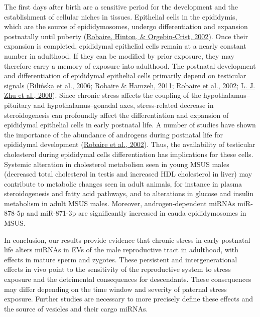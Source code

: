 \documentclass[12pt,twoside]{reedthesis}
\begin{document}
The first days after birth are a sensitive period for the development
and the establishment of cellular niches in tissues. Epithelial cells in
the epididymis, which are the source of epididymosomes, undergo
differentiation and expansion postnatally until puberty (\protect\hyperlink{ref-na_2002}{Robaire, Hinton, \& Orgebin-Crist, 2002}). Once
their expansion is completed, epididymal epithelial cells remain at a
nearly constant number in adulthood. If they can be modified by prior
exposure, they may therefore carry a memory of exposure into adulthood.
The postnatal development and differentiation of epididymal epithelial
cells primarily depend on testicular signals (\protect\hyperlink{ref-biliska_2006}{Bilińska et al., 2006}; \protect\hyperlink{ref-robaire_2011}{Robaire \& Hamzeh, 2011}; \protect\hyperlink{ref-na_2002}{Robaire et al., 2002}; \protect\hyperlink{ref-zhu_2000}{L. J. Zhu et al., 2000}). Since chronic stress affects the coupling of
the hypothalamus--pituitary and hypothalamus--gonadal axes,
stress-related decrease in steroidogenesis can profoundly affect the
differentiation and expansion of epididymal epithelial cells in early
postnatal life. A number of studies have shown the importance of the
abundance of androgens during postnatal life for epididymal development
(\protect\hyperlink{ref-na_2002}{Robaire et al., 2002}). Thus, the availability of testicular cholesterol during
epididymal cells differentiation has implications for these cells.
Systemic alteration in cholesterol metabolism seen in young MSUS males
(decreased total cholesterol in testis and increased HDL cholesterol in
liver) may contribute to metabolic changes seen in adult animals, for
instance in plasma steroidogenesis and fatty acid pathways, and to
alterations in glucose and insulin metabolism in adult MSUS males.
Moreover, androgen-dependent miRNAs miR-878-5p and miR-871-3p are
significantly increased in cauda epididymosomes in MSUS.

In conclusion, our results provide evidence that chronic stress in early
postnatal life alters miRNAs in EVs of the male reproductive tract in
adulthood, with effects in mature sperm and zygotes. These persistent
and intergenerational effects in vivo point to the sensitivity of the
reproductive system to stress exposure and the detrimental consequences
for descendants. These consequences may differ depending on the time
window and severity of paternal stress exposure. Further studies are
necessary to more precisely define these effects and the source of
vesicles and their cargo miRNAs.
\end{document}

